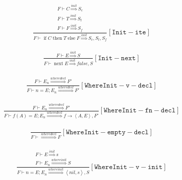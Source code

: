 \documentclass{scrartcl}
\DeclareMathOperator{\ifop}{if}
\DeclareMathOperator{\thenop}{then}
\DeclareMathOperator{\elseop}{else}
\DeclareMathOperator{\nextop}{next}
\begin{document}
    \begin{align*}
    \frac{
        \begin{matrix}
        F \vdash C \overset{init}{\Rightarrow} S_c \\
        F \vdash T \overset{init}{\Rightarrow} S_t \\
        F \vdash F \overset{init}{\Rightarrow} S_f
        \end{matrix}
    }{
        F \vdash \ifop C \thenop T \elseop F \overset{init}{\Rightarrow} S_c, S_t, S_f
    }[\mathtt{Init-ite}]
    \end{align*}
    
    \begin{align*}
    \frac{
        F \vdash E \overset{init}{\Rightarrow} S
    }{
        F \vdash \nextop E \overset{init}{\Rightarrow} false, S
    }[\mathtt{Init-next}]
    \end{align*}
    
    \begin{align*}
    \frac{
        \begin{matrix}
        F \vdash E_n \overset{wheredecl}{\Rightarrow} F'
        \end{matrix}
    }{
        F \vdash n = E; E_n \overset{wheredecl}{\Rightarrow} F'
    }[\mathtt{WhereInit-v-decl}]
    \end{align*}
    
    \begin{align*}
    \frac{
        F \vdash E_n \overset{wheredecl}{\Rightarrow} F'
    }{
        F \vdash f(A) = E; E_n \overset{wheredecl}{\Rightarrow} f \to \left<A, E \right>, F'
    }[\mathtt{WhereInit-fn-decl}]
    \end{align*}
    
    \begin{align*}
    \frac{}{
        F \vdash \overset{wheredecl}{\Rightarrow} F
    }[\mathtt{WhereInit-empty-decl}]
    \end{align*}
    
    \begin{align*}
    \frac{
        \begin{matrix}
        F \vdash E \overset{init}{\Rightarrow} s \\
        F \vdash E_n \overset{whereinit}{\Rightarrow} S
        \end{matrix}
    }{
        F \vdash n = E; E_n \overset{whereinit}{\Rightarrow} \left<nil, s\right>, S
    }[\mathtt{WhereInit-v-init}]
    \end{align*}
    
\end{document}
